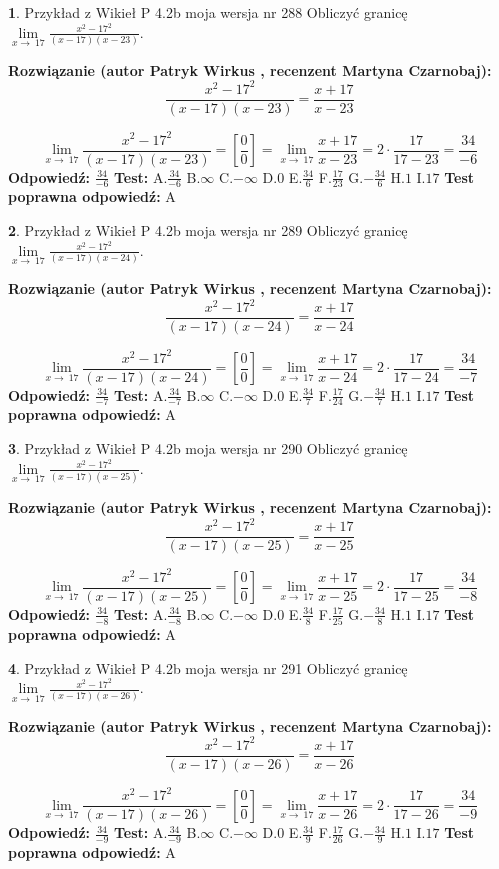\documentclass[12pt, a4paper]{article}
\theoremstyle{definition} %
\newtheorem{zad}{}
\newcommand{\zadStart}[1]{\begin{zad}#1\newline}
\newcommand{\zadStop}{\end{zad}}
\newcommand{\rozwStart}[2]{\noindent \textbf{Rozwiązanie (autor #1 , recenzent #2): }\newline}
\newcommand{\rozwStop}{\newline}
\newcommand{\odpStart}{\noindent \textbf{Odpowiedź:}\newline}
\newcommand{\odpStop}{\newline}
\newcommand{\testStart}{\noindent \textbf{Test:}\newline}
\newcommand{\testStop}{\newline}
\newcommand{\kluczStart}{\noindent \textbf{Test poprawna odpowiedź:}\newline}
\newcommand{\kluczStop}{\newline}
\begin{document}
\zadStart{Przykład z Wikieł P 4.2b moja wersja nr 288}
Obliczyć granicę $\lim\limits_{x\to\ 17}\frac{x^{2}-17^{2}}{(x-17)(x-23)}$.
\zadStop
\rozwStart{Patryk Wirkus}{Martyna Czarnobaj}
$$\frac{x^{2}-17^{2}}{(x-17)(x-23)}=\frac{x+17}{x-23}$$

$$\lim\limits_{x\to\ 17}\frac{x^{2}-17^{2}}{(x-17)(x-23)}=[\frac{0}{0}]=\lim\limits_{x\to\ 17}\frac{x+17}{x-23}=2 \cdot \frac{17}{17-23} = \frac{34}{-6}$$
\rozwStop
\odpStart
$\frac{34}{-6}$
\odpStop
\testStart
A.$\frac{34}{-6}$
B.$\infty$
C.$-\infty$
D.$0$
E.$\frac{34}{6}$
F.$\frac{17}{23}$
G.$-\frac{34}{6}$
H.$1$
I.$17$
\testStop
\kluczStart
A
\kluczStop



\zadStart{Przykład z Wikieł P 4.2b moja wersja nr 289}
Obliczyć granicę $\lim\limits_{x\to\ 17}\frac{x^{2}-17^{2}}{(x-17)(x-24)}$.
\zadStop
\rozwStart{Patryk Wirkus}{Martyna Czarnobaj}
$$\frac{x^{2}-17^{2}}{(x-17)(x-24)}=\frac{x+17}{x-24}$$

$$\lim\limits_{x\to\ 17}\frac{x^{2}-17^{2}}{(x-17)(x-24)}=[\frac{0}{0}]=\lim\limits_{x\to\ 17}\frac{x+17}{x-24}=2 \cdot \frac{17}{17-24} = \frac{34}{-7}$$
\rozwStop
\odpStart
$\frac{34}{-7}$
\odpStop
\testStart
A.$\frac{34}{-7}$
B.$\infty$
C.$-\infty$
D.$0$
E.$\frac{34}{7}$
F.$\frac{17}{24}$
G.$-\frac{34}{7}$
H.$1$
I.$17$
\testStop
\kluczStart
A
\kluczStop



\zadStart{Przykład z Wikieł P 4.2b moja wersja nr 290}
Obliczyć granicę $\lim\limits_{x\to\ 17}\frac{x^{2}-17^{2}}{(x-17)(x-25)}$.
\zadStop
\rozwStart{Patryk Wirkus}{Martyna Czarnobaj}
$$\frac{x^{2}-17^{2}}{(x-17)(x-25)}=\frac{x+17}{x-25}$$

$$\lim\limits_{x\to\ 17}\frac{x^{2}-17^{2}}{(x-17)(x-25)}=[\frac{0}{0}]=\lim\limits_{x\to\ 17}\frac{x+17}{x-25}=2 \cdot \frac{17}{17-25} = \frac{34}{-8}$$
\rozwStop
\odpStart
$\frac{34}{-8}$
\odpStop
\testStart
A.$\frac{34}{-8}$
B.$\infty$
C.$-\infty$
D.$0$
E.$\frac{34}{8}$
F.$\frac{17}{25}$
G.$-\frac{34}{8}$
H.$1$
I.$17$
\testStop
\kluczStart
A
\kluczStop



\zadStart{Przykład z Wikieł P 4.2b moja wersja nr 291}
Obliczyć granicę $\lim\limits_{x\to\ 17}\frac{x^{2}-17^{2}}{(x-17)(x-26)}$.
\zadStop
\rozwStart{Patryk Wirkus}{Martyna Czarnobaj}
$$\frac{x^{2}-17^{2}}{(x-17)(x-26)}=\frac{x+17}{x-26}$$

$$\lim\limits_{x\to\ 17}\frac{x^{2}-17^{2}}{(x-17)(x-26)}=[\frac{0}{0}]=\lim\limits_{x\to\ 17}\frac{x+17}{x-26}=2 \cdot \frac{17}{17-26} = \frac{34}{-9}$$
\rozwStop
\odpStart
$\frac{34}{-9}$
\odpStop
\testStart
A.$\frac{34}{-9}$
B.$\infty$
C.$-\infty$
D.$0$
E.$\frac{34}{9}$
F.$\frac{17}{26}$
G.$-\frac{34}{9}$
H.$1$
I.$17$
\testStop
\kluczStart
A
\kluczStop
\end{document}
